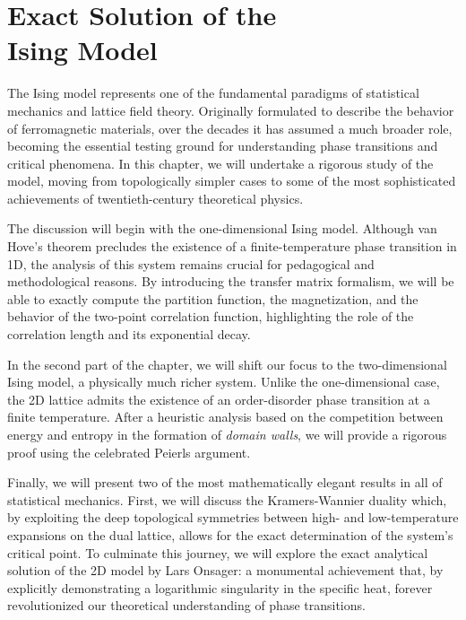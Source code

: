 \chapter[Exact Solution of the Ising Model]{Exact Solution of the \\Ising Model}

The Ising model represents one of the fundamental paradigms of statistical mechanics and lattice field theory. Originally formulated to describe the behavior of ferromagnetic materials, over the decades it has assumed a much broader role, becoming the essential testing ground for understanding phase transitions and critical phenomena. In this chapter, we will undertake a rigorous study of the model, moving from topologically simpler cases to some of the most sophisticated achievements of twentieth-century theoretical physics.

The discussion will begin with the one-dimensional Ising model. Although van Hove's theorem precludes the existence of a finite-temperature phase transition in 1D, the analysis of this system remains crucial for pedagogical and methodological reasons. By introducing the transfer matrix formalism, we will be able to exactly compute the partition function, the magnetization, and the behavior of the two-point correlation function, highlighting the role of the correlation length and its exponential decay.

In the second part of the chapter, we will shift our focus to the two-dimensional Ising model, a physically much richer system. Unlike the one-dimensional case, the 2D lattice admits the existence of an order-disorder phase transition at a finite temperature. After a heuristic analysis based on the competition between energy and entropy in the formation of \textit{domain walls}, we will provide a rigorous proof using the celebrated Peierls argument.

Finally, we will present two of the most mathematically elegant results in all of statistical mechanics. First, we will discuss the Kramers-Wannier duality which, by exploiting the deep topological symmetries between high- and low-temperature expansions on the dual lattice, allows for the exact determination of the system's critical point. To culminate this journey, we will explore the exact analytical solution of the 2D model by Lars Onsager: a monumental achievement that, by explicitly demonstrating a logarithmic singularity in the specific heat, forever revolutionized our theoretical understanding of phase transitions.

